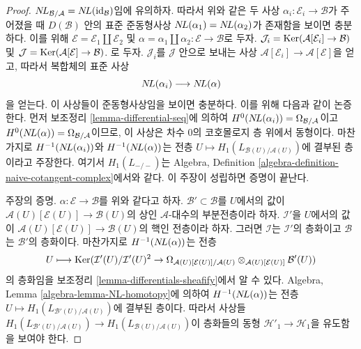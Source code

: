 \begin{proof}
$\mathop{N\!L}\nolimits_{\mathcal{B}/\mathcal{A}} = \mathop{N\!L}\nolimits(\text{id}_\mathcal{B})$임에 유의하자.
따라서 위와 같은 두 사상
$\alpha_i : \mathcal{E}_i \to \mathcal{B}$가 주어졌을 때
$D(\mathcal{B})$ 안의 표준 준동형사상
$\mathop{N\!L}\nolimits(\alpha_1) = \mathop{N\!L}\nolimits(\alpha_2)$가 존재함을 보이면 충분하다.
이를 위해 $\mathcal{E} = \mathcal{E}_1 \amalg \mathcal{E}_2$ 및
$\alpha = \alpha_1 \amalg \alpha_2 : \mathcal{E} \to \mathcal{B}$로 두자.
$\mathcal{J}_i = \mathop{\mathrm{Ker}}(\mathcal{A}[\mathcal{E}_i] \to \mathcal{B})$
및
$\mathcal{J} = \mathop{\mathrm{Ker}}(\mathcal{A}[\mathcal{E}] \to \mathcal{B})$.
로 두자. $\mathcal{J}_i$를 $\mathcal{J}$ 안으로 보내는 사상
$\mathcal{A}[\mathcal{E}_i] \to \mathcal{A}[\mathcal{E}]$을 얻고,
따라서 복합체의 표준 사상
$$
\mathop{N\!L}\nolimits(\alpha_i) \longrightarrow \mathop{N\!L}\nolimits(\alpha)
$$
을 얻는다. 이 사상들이 준동형사상임을 보이면 충분하다. 이를 위해
다음과 같이 논증한다. 먼저 보조정리 \ref{lemma-differential-seq}에 의하여
$H^0(\mathop{N\!L}\nolimits(\alpha_i)) = \Omega_{\mathcal{B}/\mathcal{A}}$이고
$H^0(\mathop{N\!L}\nolimits(\alpha)) = \Omega_{\mathcal{B}/\mathcal{A}}$이므로, 이 사상은
차수 $0$의 코호몰로지 층 위에서 동형이다. 마찬가지로
$H^{-1}(\mathop{N\!L}\nolimits(\alpha_i))$와 $H^{-1}(\mathop{N\!L}\nolimits(\alpha))$는 전층
$U \mapsto H_1(L_{\mathcal{B}(U)/\mathcal{A}(U)})$에 결부된 층이라고
주장한다. 여기서 $H_1(L_{-/-})$는 Algebra, Definition
\ref{algebra-definition-naive-cotangent-complex}에서와 같다.
이 주장이 성립하면 증명이 끝난다.

\medskip\noindent
주장의 증명. $\alpha : \mathcal{E} \to \mathcal{B}$를 위와 같다고 하자.
$\mathcal{B}' \subset \mathcal{B}$를 $U$에서의 값이
$\mathcal{A}(U)[\mathcal{E}(U)] \to \mathcal{B}(U)$의 상인
$\mathcal{A}$-대수의 부분전층이라 하자. $\mathcal{I}'$을 $U$에서의 값이
$\mathcal{A}(U)[\mathcal{E}(U)] \to \mathcal{B}(U)$의 핵인 전층이라 하자.
그러면 $\mathcal{I}$는 $\mathcal{I}'$의 층화이고 $\mathcal{B}$는
$\mathcal{B}'$의 층화이다. 마찬가지로 $H^{-1}(\mathop{N\!L}\nolimits(\alpha))$는 전층
$$
U \longmapsto
\mathop{\mathrm{Ker}}(\mathcal{I}'(U)/\mathcal{I}'(U)^2 \to
\Omega_{\mathcal{A}(U)[\mathcal{E}(U)]/\mathcal{A}(U)}
\otimes_{\mathcal{A}(U)[\mathcal{E}(U)]} \mathcal{B}'(U))
$$
의 층화임을 보조정리 \ref{lemma-differentials-sheafify}에서 알 수 있다.
Algebra, Lemma \ref{algebra-lemma-NL-homotopy}에 의하여
$H^{-1}(\mathop{N\!L}\nolimits(\alpha))$는 전층
$U \mapsto H_1(L_{\mathcal{B}'(U)/\mathcal{A}(U)})$에 결부된 층이다.
따라서 사상들
$H_1(L_{\mathcal{B}'(U)/\mathcal{A}(U)}) \to
H_1(L_{\mathcal{B}(U)/\mathcal{A}(U)})$이 층화들의 동형
$\mathcal{H}'_1 \to \mathcal{H}_1$을 유도함을 보여야 한다.


\end{proof}
